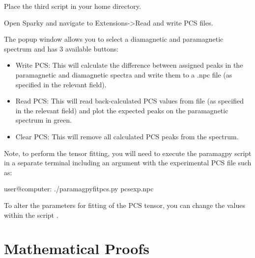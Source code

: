 \documentclass[a4paper,10pt,english,openany,oneside]{sphinxmanual}
\begin{document}
Place the third script  in your home directory.

Open Sparky and navigate to Extensions-\textgreater{}Read and write PCS files.

\noindent{}

The popup window allows you to select a diamagnetic and paramagnetic spectrum and has 3 available buttons:
\begin{itemize}
\item {} 
Write PCS: This will calculate the difference between assigned peaks in the paramagnetic and diamagnetic spectra and write them to a .npc file (as specified in the relevant field).

\item {} 
Read PCS: This will read back-calculated PCS values from file (as specified in the relevant field) and plot the expected peaks on the paramagnetic spectrum in green.

\item {} 
Clear PCS: This will remove all calculated PCS peaks from the spectrum.

\end{itemize}

Note, to perform the tensor fitting, you will need to execute the paramagpy script in a separate terminal including an argument with the experimental PCS file such as:

%
\begin{sphinxVerbatim}[commandchars=\\\{\}]
user@computer:\PYGZti{}\PYGZdl{} ./paramagpy\PYGZus{}fit\PYGZus{}pcs.py pcsexp.npc
\end{sphinxVerbatim}

To alter the parameters for fitting of the PCS tensor, you can change the values within the script .


\section{Mathematical Proofs}
\label{\detokenize{mathematical_proofs:mathematical-proofs}}\label{\detokenize{mathematical_proofs::doc}}
\end{document}
